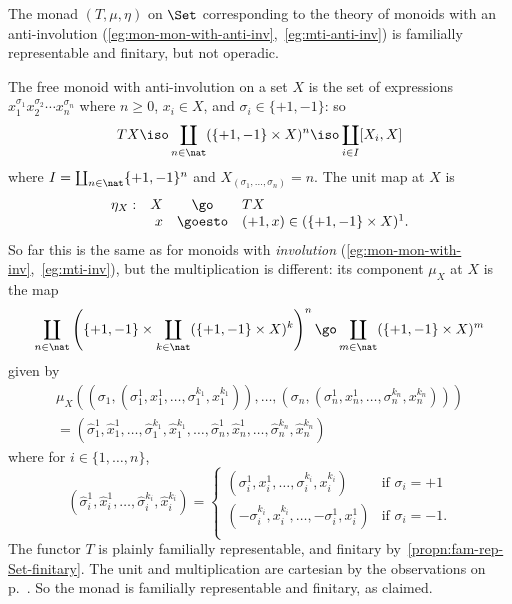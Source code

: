 \begin{example}		
The monad $(T, \mu, \eta)$ on $\Set$ corresponding to the theory of
monoids%
%
%
with an anti-involution
(\ref{eg:mon-mon-with-anti-inv},~\ref{eg:mti-anti-inv}) is familially
representable and finitary, but not operadic.

The free monoid with anti-involution on a set $X$ is the set of expressions
$x_1^{\sigma_1} x_2^{\sigma_2} \cdots x_n^{\sigma_n}$ where $n\geq 0$, $x_i
\in X$, and $\sigma_i \in \{+1, -1\}$: so 
\[
TX \iso \coprod_{n\in\nat} (\{+1, -1\} \times X)^n
\iso \coprod_{i\in I} [X_i, X]
\]
where $I = \coprod_{n\in\nat} \{+1, -1\}^n$ and $X_{(\sigma_1, \ldots,
\sigma_n)} = n$.  The unit map at $X$ is 
\[
\begin{array}{rrcl}
\eta_X:	&X	&\go		&TX	\\
	&x	&\goesto	&(+1, x) \in (\{+1,-1\} \times X)^1.
\end{array}
\]
So far this is the same as for monoids with \emph{involution}
(\ref{eg:mon-mon-with-inv},~\ref{eg:mti-inv}), but the multiplication is
different: its component $\mu_X$ at $X$ is the map
\[
\coprod_{n\in\nat} \left(
\{+1,-1\} \times 
\coprod_{k\in\nat} (\{+1,-1\} \times X)^k 
\right)^n
\go
\coprod_{m\in\nat} (\{+1,-1\} \times X)^m
\]
given by
\[
\begin{array}{r}
% 
\mu_X\left(
(\sigma_1, (\sigma_1^1, x_1^1, \ldots, \sigma_1^{k_1}, x_1^{k_1})),
\ldots,
(\sigma_n, (\sigma_n^1, x_n^1, \ldots, \sigma_n^{k_n}, x_n^{k_n}))
\right)	\\
= 
(\hat{\sigma}_1^1, \hat{x}_1^1, \ldots, 
	\hat{\sigma}_1^{k_1}, \hat{x}_1^{k_1},
\ldots,
\hat{\sigma}_n^1, \hat{x}_n^1, \ldots, 
	\hat{\sigma}_n^{k_n}, \hat{x}_n^{k_n})
% 
\end{array}
\]
where for $i\in \{1, \ldots, n\}$,
\[
(\hat{\sigma}_i^1, \hat{x}_i^1, \ldots, 
	\hat{\sigma}_i^{k_i}, \hat{x}_i^{k_i})
=
\left\{
\begin{array}{ll}
(\sigma_i^1, x_i^1, \ldots, \sigma_i^{k_i}, x_i^{k_i})	&
\textrm{if } \sigma_i = +1	\\
(-\sigma_i^{k_i}, x_i^{k_i}, \ldots, -\sigma_i^1, x_i^1)&
\textrm{if } \sigma_i = -1.	\\
\end{array}
\right.
\]
The functor $T$ is plainly familially representable, and finitary
by~\ref{propn:fam-rep-Set-finitary}.  The unit and multiplication are
cartesian by the observations on p.~\pageref{p:cart-transf-fam-rep}.  So
the monad is familially representable and finitary, as claimed.


\end{example}
